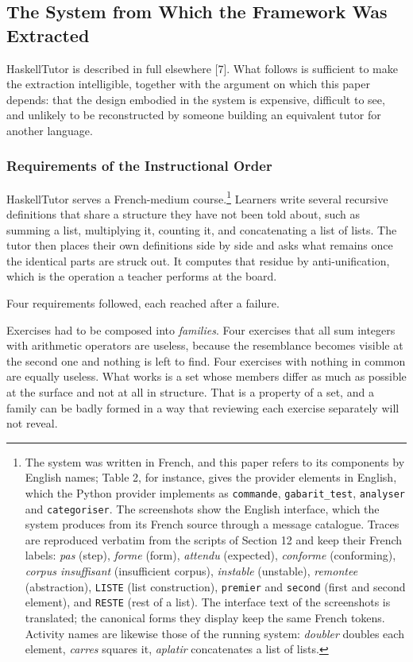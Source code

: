 \documentclass[10pt,twocolumn,letterpaper]{article}
\begin{document}
\subsection{The System from Which the Framework Was Extracted}
HaskellTutor is described in full elsewhere [7]. What follows is
sufficient to make the extraction intelligible, together with the
argument on which this paper depends: that the design embodied in the
system is expensive, difficult to see, and unlikely to be reconstructed
by someone building an equivalent tutor for another language.

\subsubsection{Requirements of the Instructional Order}
HaskellTutor serves a French-medium course.\footnote{The system was written in French, and this paper
refers to its components by English names; Table 2, for instance, gives the
provider elements in English, which the Python provider implements as
\texttt{commande}, \texttt{gabarit\_test}, \texttt{analyser} and
\texttt{categoriser}. The screenshots show the English interface, which the system produces
from its French source through a message catalogue.
Traces are reproduced verbatim from the scripts of Section 12 and keep
their French labels: \emph{pas} (step), \emph{forme} (form),
\emph{attendu} (expected), \emph{conforme} (conforming), \emph{corpus
insuffisant} (insufficient corpus), \emph{instable} (unstable),
\emph{remontee} (abstraction), \texttt{LISTE} (list construction),
\texttt{premier} and \texttt{second} (first and second element), and
\texttt{RESTE} (rest of a list). The interface text of the screenshots is
translated; the canonical forms they display keep the same French tokens.
Activity names are likewise those of the running system: \emph{doubler}
doubles each element, \emph{carres} squares it, \emph{aplatir}
concatenates a list of lists.} Learners write several
recursive definitions that share a structure they
have not been told about, such as summing a list, multiplying it,
counting it, and concatenating a list of lists. The tutor then places
their own definitions side by side and asks what remains once the
identical parts are struck out. It computes that residue by
anti-unification, which is the operation a teacher performs at the
board.

Four requirements followed, each reached after a failure.

Exercises had to be composed into \emph{families}. Four exercises that
all sum integers with arithmetic operators are useless, because the
resemblance becomes visible at the second one and nothing is left to
find. Four exercises with nothing in common are equally useless. What
works is a set whose members differ as much as possible at the surface
and not at all in structure. That is a property of a set, and a family
can be badly formed in a way that reviewing each exercise separately
will not reveal.
\end{document}
